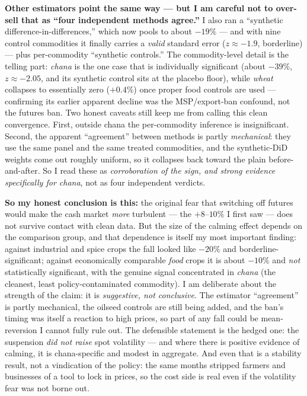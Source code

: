 \documentclass[11pt]{article}
\begin{document}
\textbf{Other estimators point the same way --- but I am careful not to over-sell that as ``four independent methods agree.''} I also ran a ``synthetic difference-in-differences,'' which now pools to about $-19\%$ --- and with nine control commodities it finally carries a \emph{valid} standard error ($z \approx -1.9$, borderline) --- plus per-commodity ``synthetic controls.'' The commodity-level detail is the telling part: \emph{chana} is the one case that is individually significant (about $-39\%$, $z \approx -2.05$, and its synthetic control sits at the placebo floor), while \emph{wheat} collapses to essentially zero ($+0.4\%$) once proper food controls are used --- confirming its earlier apparent decline was the MSP/export-ban confound, not the futures ban. Two honest caveats still keep me from calling this clean convergence. First, outside chana the per-commodity inference is insignificant. Second, the apparent ``agreement'' between methods is partly \emph{mechanical}: they use the same panel and the same treated commodities, and the synthetic-DiD weights come out roughly uniform, so it collapses back toward the plain before-and-after. So I read these as \emph{corroboration of the sign, and strong evidence specifically for chana}, not as four independent verdicts.

\textbf{So my honest conclusion is this:} the original fear that switching off futures would make the cash market \emph{more} turbulent --- the $+8$--$10\%$ I first saw --- does not survive contact with clean data. But the size of the calming effect depends on the comparison group, and that dependence is itself my most important finding: against industrial and spice crops the fall looked like $-20\%$ and borderline-significant; against economically comparable \emph{food} crops it is about $-10\%$ and \emph{not} statistically significant, with the genuine signal concentrated in \emph{chana} (the cleanest, least policy-contaminated commodity). I am deliberate about the strength of the claim: it is \emph{suggestive, not conclusive}. The estimator ``agreement'' is partly mechanical, the oilseed controls are still being added, and the ban's timing was itself a reaction to high prices, so part of any fall could be mean-reversion I cannot fully rule out. The defensible statement is the hedged one: the suspension \emph{did not raise} spot volatility --- and where there is positive evidence of calming, it is chana-specific and modest in aggregate. And even that is a stability result, not a vindication of the policy: the same months stripped farmers and businesses of a tool to lock in prices, so the cost side is real even if the volatility fear was not borne out.
\end{document}
